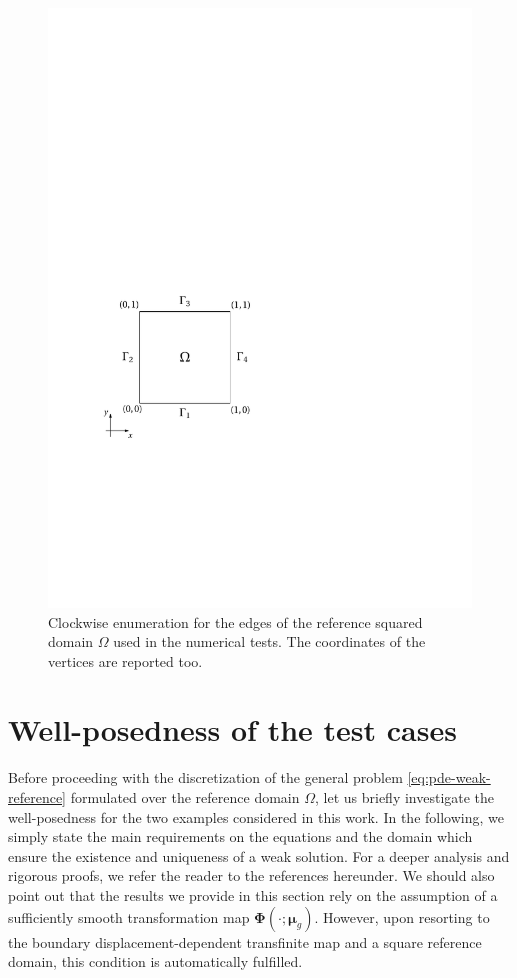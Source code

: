 \documentclass[12pt, a4paper, twoside, openright, notitlepage]{report}
\numberwithin{equation}{chapter}
\theoremstyle{theorem}
\theoremstyle{definition}
\theoremstyle{remark}
\theoremstyle{proposition}
\numberwithin{figure}{chapter}
\newcommand{\bg}[1]{\boldsymbol{#1}}
\begin{document}
		\begin{figure}[t]
			\center
			\includegraphics[scale = 0.725]{bc_square}
			
			\caption{Clockwise enumeration for the edges of the reference squared domain $\Omega$ used in the numerical tests. The coordinates of the vertices are reported too.}
			\label{fig:bc-square}
		\end{figure}
		
	\vspace*{0.3cm}
	
	\section{Well-posedness of the test cases}
	\label{section:Well-posedness of the test cases}
	
		Before proceeding with the discretization of the general problem \eqref{eq:pde-weak-reference} formulated over the reference domain $\Omega$, let us briefly investigate the well-posedness for the two examples considered in this work. In the following, we simply state the main requirements on the equations and the domain which ensure the existence and uniqueness of a weak solution. For a deeper analysis and rigorous proofs, we refer the reader to the references hereunder. We should also point out that the results we provide in this section rely on the assumption of a sufficiently smooth transformation map $\bg{\Phi}(\cdot; \bg{\mu}_g)$. However, upon resorting to the boundary displacement-dependent transfinite map and a square reference domain, this condition is automatically fulfilled. 
		
\end{document}
